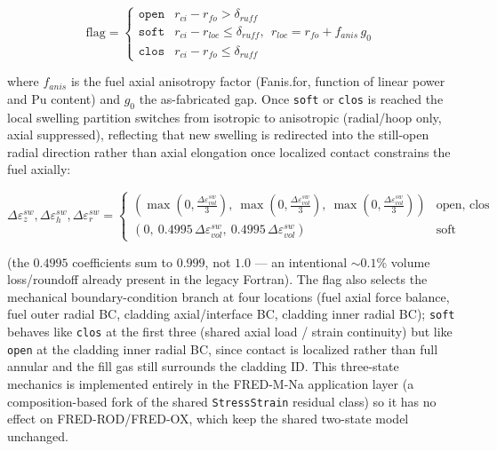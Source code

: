 \begin{refsection}
\begin{equation}
  \text{flag} = \begin{cases}
    \texttt{open} & r_{ci} - r_{fo} > \delta_{ruff} \\
    \texttt{soft} & r_{ci} - r_{loc} \le \delta_{ruff},\ \ r_{loc} = r_{fo} + f_{anis}\,g_0 \\
    \texttt{clos} & r_{ci} - r_{fo} \le \delta_{ruff}
  \end{cases}
  \label{eq:gap_flag}
\end{equation}

where $f_{anis}$ is the fuel axial anisotropy factor (Fanis.for, function of linear power and Pu content) and $g_0$ the as-fabricated gap. Once \texttt{soft} or \texttt{clos} is reached the local swelling partition switches from isotropic to anisotropic (radial/hoop only, axial suppressed), reflecting that new swelling is redirected into the still-open radial direction rather than axial elongation once localized contact constrains the fuel axially:

\begin{equation}
  \Delta\varepsilon^{sw}_z, \Delta\varepsilon^{sw}_h, \Delta\varepsilon^{sw}_r =
  \begin{cases}
    \left(\max(0,\tfrac{\Delta\varepsilon^{sw}_{vol}}{3}),\ \max(0,\tfrac{\Delta\varepsilon^{sw}_{vol}}{3}),\ \max(0,\tfrac{\Delta\varepsilon^{sw}_{vol}}{3})\right) & \text{open, clos} \\
    \left(0,\ 0.4995\,\Delta\varepsilon^{sw}_{vol},\ 0.4995\,\Delta\varepsilon^{sw}_{vol}\right) & \text{soft}
  \end{cases}
  \label{eq:swel_anisotropy}
\end{equation}

(the $0.4995$ coefficients sum to $0.999$, not $1.0$ — an intentional $\sim0.1\%$ volume loss/roundoff already present in the legacy Fortran). The flag also selects the mechanical boundary-condition branch at four locations (fuel axial force balance, fuel outer radial BC, cladding axial/interface BC, cladding inner radial BC); \texttt{soft} behaves like \texttt{clos} at the first three (shared axial load / strain continuity) but like \texttt{open} at the cladding inner radial BC, since contact is localized rather than full annular and the fill gas still surrounds the cladding ID. This three-state mechanics is implemented entirely in the FRED-M-Na application layer (a composition-based fork of the shared \texttt{StressStrain} residual class) so it has no effect on FRED-ROD/FRED-OX, which keep the shared two-state model unchanged.


\end{refsection}
